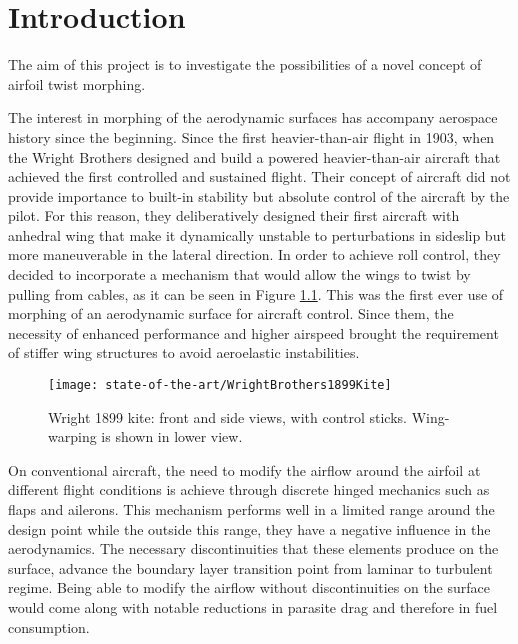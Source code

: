 \chapter{Introduction} \label{chap:introduction}

The aim of this project is to investigate the possibilities of a novel concept of airfoil twist morphing.

The interest in morphing of the aerodynamic surfaces has accompany aerospace history since the beginning. Since the first heavier-than-air flight in 1903, when the Wright Brothers designed and build a powered heavier-than-air aircraft that achieved the  first controlled and sustained flight. Their concept of aircraft did not provide importance to built-in stability but absolute control of the aircraft by the pilot. For this reason, they deliberatively designed their first aircraft with anhedral wing that make it dynamically unstable to perturbations in sideslip but more maneuverable in the lateral direction. In order to achieve roll control, they decided to incorporate a mechanism that would allow the wings to twist by pulling from cables, as it can be seen in Figure \ref{fig:Wright}. This was the first ever use of morphing of an aerodynamic surface for aircraft control. Since them, the necessity of enhanced performance and higher airspeed brought the requirement of stiffer wing structures to avoid aeroelastic instabilities.

\begin{figure}[!htpb]
  \centering
  \texttt{[image: state-of-the-art/WrightBrothers1899Kite]}
  \caption[Wright Brothers 1899 kite]{Wright 1899 kite: front and side views, with control sticks. Wing-warping is shown in lower view. \cite{Wright}}\label{fig:Wright}
\end{figure}

On conventional aircraft, the need to modify the airflow around the airfoil at different flight conditions is achieve through discrete hinged mechanics such as flaps and ailerons. This mechanism performs well in a limited range around the design point while the outside this range, they have a negative influence in the aerodynamics. The necessary discontinuities that these elements produce on the surface, advance the boundary layer transition point from laminar to turbulent regime. Being able to modify the airflow without discontinuities on the surface would come along with notable reductions in parasite drag and therefore in fuel consumption.


